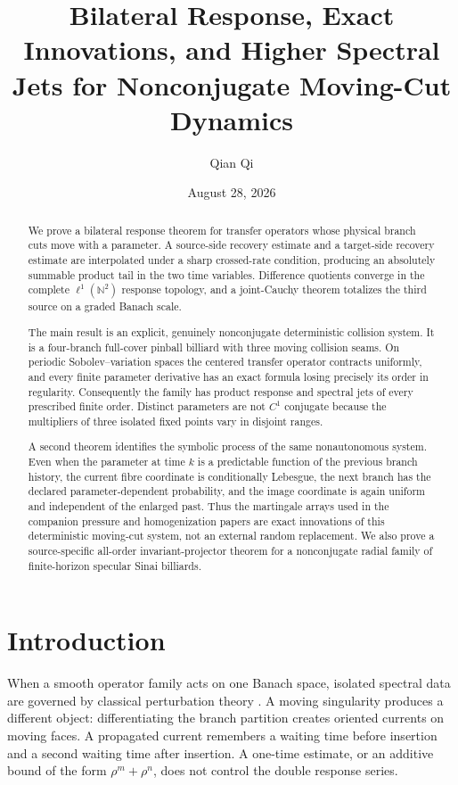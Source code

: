 \documentclass[11pt,reqno]{amsart}
\title[Bilateral response and exact innovations]{Bilateral Response, Exact Innovations, and Higher Spectral Jets for Nonconjugate Moving-Cut Dynamics}
\author{Qian Qi}
\date{August 28, 2026}
\theoremstyle{definition}
\theoremstyle{remark}
\newcommand{\N}{\mathbb N}
\begin{document}
\begin{abstract}
We prove a bilateral response theorem for transfer operators whose physical
branch cuts move with a parameter.  A source-side recovery estimate and a
target-side recovery estimate are interpolated under a sharp crossed-rate
condition, producing an absolutely summable product tail in the two time
variables.  Difference quotients converge in the complete
$\ell^1(\N^2)$ response topology, and a joint-Cauchy theorem totalizes the
third source on a graded Banach scale.

The main result is an explicit, genuinely nonconjugate deterministic collision
system.  It is a four-branch full-cover pinball billiard with three moving
collision seams.  On periodic Sobolev--variation spaces the centered transfer
operator contracts uniformly, and every finite parameter derivative has an
exact formula losing precisely its order in regularity.  Consequently the
family has product response and spectral jets of every prescribed finite
order.  Distinct parameters are not $C^1$ conjugate because the multipliers of
three isolated fixed points vary in disjoint ranges.

A second theorem identifies the symbolic process of the same nonautonomous
system.  Even when the parameter at time $k$ is a predictable function of the
previous branch history, the current fibre coordinate is conditionally
Lebesgue, the next branch has the declared parameter-dependent probability,
and the image coordinate is again uniform and independent of the enlarged
past.  Thus the martingale arrays used in the companion pressure and
homogenization papers are exact innovations of this deterministic moving-cut
system, not an external random replacement.  We also prove a source-specific
all-order invariant-projector theorem for a nonconjugate radial family of
finite-horizon specular Sinai billiards.
\end{abstract}

\maketitle
\tableofcontents

\section{Introduction}

When a smooth operator family acts on one Banach space, isolated spectral data
are governed by classical perturbation theory \cite{Kato1995}.  A moving
singularity produces a different object: differentiating the branch partition
creates oriented currents on moving faces.  A propagated current remembers a
waiting time before insertion and a second waiting time after insertion.  A
one-time estimate, or an additive bound of the form $\rho^m+\rho^n$, does not
control the double response series.
\end{document}
